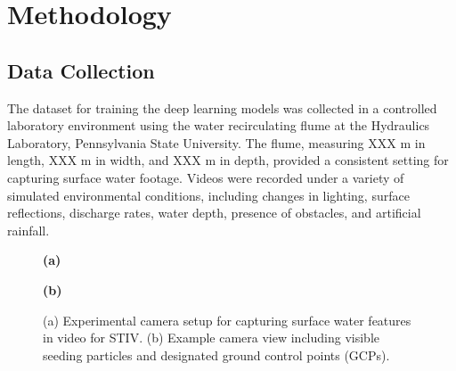 \documentclass[12pt]{elsarticle}
\begin{document}
\section{Methodology}
\label{sec:Methodology}
\subsection{Data Collection}
The dataset for training the deep learning models was collected in a controlled laboratory environment using the water recirculating flume at the Hydraulics Laboratory, Pennsylvania State University. The flume, measuring XXX m in length, XXX m in width, and XXX m in depth, provided a consistent setting for capturing surface water footage. Videos were recorded under a variety of simulated environmental conditions, including changes in lighting, surface reflections, discharge rates, water depth, presence of obstacles, and artificial rainfall.
\begin{figure}[!htbp]
    \centering
    \begin{minipage}[b]{0.48\textwidth}
        \centering
        \setlength{\fboxsep}{0pt}
        \textbf{(a)} 
    \end{minipage}
    \hfill
    \begin{minipage}[b]{0.48\textwidth}
        \centering
        \setlength{\fboxsep}{0pt}
        \textbf{(b)}
    \end{minipage}
    \caption{(a) Experimental camera setup for capturing surface water features in video for STIV. (b) Example camera view including visible seeding particles and designated ground control points (GCPs).}
    \label{fig:camera_setup}
\end{figure}
\end{document}
